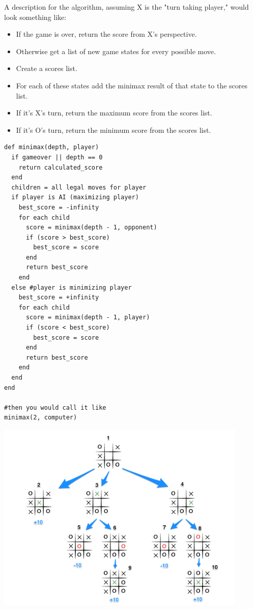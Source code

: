 A description for the algorithm, assuming X is the "turn taking player," would look something like: 

\begin{itemize}
	\itemsep-0.5em 
	\item If the game is over, return the score from X's perspective.
	\item Otherwise get a list of new game states for every possible move.
	\item Create a scores list.
	\item For each of these states add the minimax result of that state to the scores list.
	\item If it's X's turn, return the maximum score from the scores list.
	\item If it's O's turn, return the minimum score from the scores list.
\end{itemize}

\begin{lstlisting}
def minimax(depth, player)
  if gameover || depth == 0
    return calculated_score
  end
  children = all legal moves for player
  if player is AI (maximizing player)
    best_score = -infinity
    for each child
      score = minimax(depth - 1, opponent)
      if (score > best_score)
        best_score = score
      end
      return best_score
    end
  else #player is minimizing player
    best_score = +infinity
    for each child
      score = minimax(depth - 1, player)
      if (score < best_score)
        best_score = score
      end
      return best_score
    end
  end
end

#then you would call it like
minimax(2, computer)
\end{lstlisting}

\begin{center}
\includegraphics[width=0.9\textwidth]{./full-minimax-move-tree}
\end{center}

